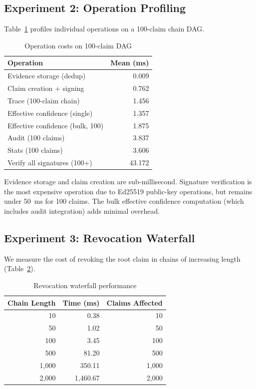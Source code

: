 \documentclass[11pt,twocolumn]{article}
\begin{document}
\subsection{Experiment 2: Operation Profiling}

Table~\ref{tab:operations} profiles individual operations on a 100-claim chain DAG.

\begin{table}[H]
\centering
\caption{Operation costs on 100-claim DAG}
\label{tab:operations}
\begin{tabular}{@{}lr@{}}
\toprule
\textbf{Operation} & \textbf{Mean (ms)} \\
\midrule
Evidence storage (dedup) & 0.009 \\
Claim creation + signing & 0.762 \\
Trace (100-claim chain) & 1.456 \\
Effective confidence (single) & 1.357 \\
Effective confidence (bulk, 100) & 1.875 \\
Audit (100 claims) & 3.837 \\
Stats (100 claims) & 3.606 \\
Verify all signatures (100+) & 43.172 \\
\bottomrule
\end{tabular}
\end{table}

Evidence storage and claim creation are sub-millisecond. Signature verification is the most expensive operation due to Ed25519 public-key operations, but remains under 50~ms for 100 claims. The bulk effective confidence computation (which includes audit integration) adds minimal overhead.

\subsection{Experiment 3: Revocation Waterfall}

We measure the cost of revoking the root claim in chains of increasing length (Table~\ref{tab:revocation}).

\begin{table}[H]
\centering
\caption{Revocation waterfall performance}
\label{tab:revocation}
\begin{tabular}{@{}rrr@{}}
\toprule
\textbf{Chain Length} & \textbf{Time (ms)} & \textbf{Claims Affected} \\
\midrule
10 & 0.38 & 10 \\
50 & 1.02 & 50 \\
100 & 3.45 & 100 \\
500 & 81.20 & 500 \\
1{,}000 & 350.11 & 1{,}000 \\
2{,}000 & 1{,}460.67 & 2{,}000 \\
\bottomrule
\end{tabular}
\end{table}
\end{document}
